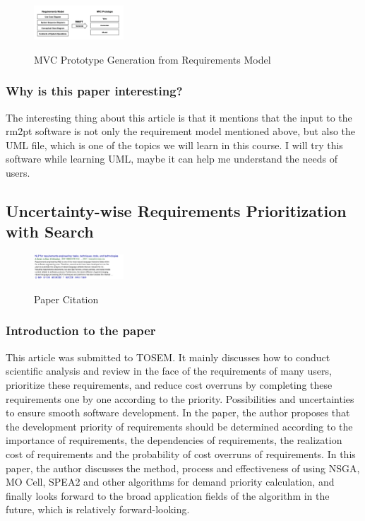\documentclass[UTF8]{IEEEtran}
\begin{document}
\begin{figure}[h]
    \centering
    \includegraphics[width=0.3\textwidth]{./img/rm2pt_fig1.png}\\
    \caption{\label{fig:iden3}MVC Prototype Generation from Requirements Model }
\end{figure}

\subsubsection{Why is this paper interesting?}
The interesting thing about this article is that it mentions that the input to the rm2pt software is not only the requirement model mentioned above, but also the UML file, which is one of the topics we will learn in this course. I will try this software while learning UML, maybe it can help me understand the needs of users.

\subsection{Uncertainty-wise Requirements Prioritization with Search}

\begin{figure}[h]
    \centering
    \includegraphics[width=0.3\textwidth]{./img/nlp_cite.png}\\
    \caption{\label{fig:iden4}Paper Citation }
\end{figure}

\subsubsection{Introduction to the paper}
This article\cite{zhang2020uncertainty} was submitted to TOSEM. It mainly discusses how to conduct scientific analysis and review in the face of the requirements of many users, prioritize these requirements, and reduce cost overruns by completing these requirements one by one according to the priority. Possibilities and uncertainties to ensure smooth software development. In the paper, the author proposes that the development priority of requirements should be determined according to the importance of requirements, the dependencies of requirements, the realization cost of requirements and the probability of cost overruns of requirements. In this paper, the author discusses the method, process and effectiveness of using NSGA, MO Cell, SPEA2 and other algorithms for demand priority calculation, and finally looks forward to the broad application fields of the algorithm in the future, which is relatively forward-looking.
\end{document}
